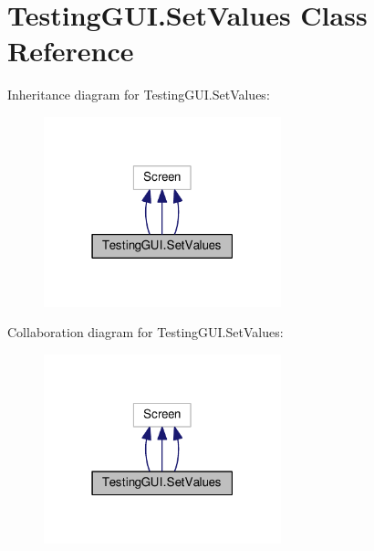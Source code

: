\hypertarget{classTestingGUI_1_1SetValues}{}\section{Testing\+G\+U\+I.\+Set\+Values Class Reference}
\label{classTestingGUI_1_1SetValues}


Inheritance diagram for Testing\+G\+U\+I.\+Set\+Values\+:
\nopagebreak
\begin{figure}[H]
\begin{center}
\leavevmode
\includegraphics[width=195pt]{classTestingGUI_1_1SetValues__inherit__graph}
\end{center}
\end{figure}


Collaboration diagram for Testing\+G\+U\+I.\+Set\+Values\+:
\nopagebreak
\begin{figure}[H]
\begin{center}
\leavevmode
\includegraphics[width=195pt]{classTestingGUI_1_1SetValues__coll__graph}
\end{center}
\end{figure}
